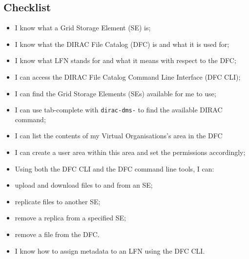 \subsection{Checklist}
\label{putting-data-on-the-grid---checklist}

\begin{itemize}
\tightlist
\item
  I know what a Grid Storage Element (SE) is;
\item
  I know what the DIRAC File Catalog (DFC) is and what it is used for;
\item
  I know what LFN stands for and what it means with respect to the DFC;
\item
  I can access the DIRAC File Catalog Command Line Interface (DFC CLI);
\item
  I can find the Grid Storage Elements (SEs) available for me to use;
\item
  I can use tab-complete with \texttt{dirac-dms-} to find the available
  DIRAC command;
\item
  I can list the contents of my Virtual Organisations's area in the DFC
\item
  I can create a user area within this area and set the permissions
  accordingly;
\item
  Using both the DFC CLI and the DFC command line tools, I can:
\item
  upload and download files to and from an SE;
\item
  replicate files to another SE;
\item
  remove a replica from a specified SE;
\item
  remove a file from the DFC.
\item
  I know how to assign metadata to an LFN using the DFC CLI.
\end{itemize}

